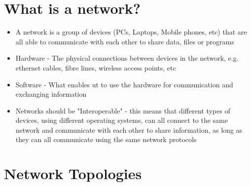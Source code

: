
\section*{What is a network?}

\begin{itemize}
  \item A network is a group of devices (PCs, Laptops, Mobile phones, etc) that are all able to communicate with each other to share data, files or programs
  \item Hardware - The physical connections between devices in the network, e.g. ethernet cables, fibre lines, wireless access points, etc
  \item Software - What enables ut to use the hardware for communication and exchanging information
  \item Networks should be "Interoperable" - this means that different types of devices, using different operating systems, can all connect to the same network and communicate with each other to share information, as long as they can all communicate using the same network protocols
\end{itemize}

\section*{Network Topologies}


